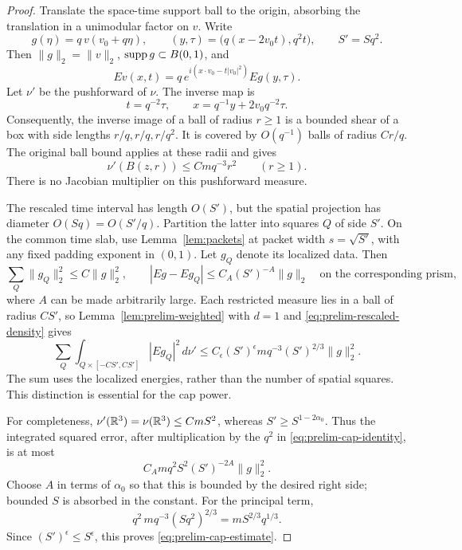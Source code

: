 \begin{proof}
Translate the space-time support ball to the origin, absorbing the
translation in a unimodular factor on $v$.  Write
\[
 g(\eta)=q\,v(v_0+q\eta),\qquad
 (y,\tau)=\bigl(q(x-2v_0t),q^2t\bigr),\qquad S'=Sq^2.
\]
Then $\|g\|_2=\|v\|_2$, $\operatorname{supp} g\subset B(0,1)$, and
\begin{equation}
 Ev(x,t)=q\,e^{i(x\cdot v_0-t|v_0|^2)}Eg(y,\tau).
 \label{eq:prelim-cap-identity}
\end{equation}
Let $\nu'$ be the pushforward of $\nu$.  The inverse map is
\[
 t=q^{-2}\tau,\qquad x=q^{-1}y+2v_0q^{-2}\tau.
\]
Consequently, the inverse image of a ball of radius $r\geq1$ is a bounded
shear of a box with side lengths $r/q,r/q,r/q^2$.  It is covered by
$O(q^{-1})$ balls of radius $Cr/q$.  The original ball bound applies at
these radii and gives
\begin{equation}
 \nu'(B(z,r))\leq Cm q^{-3}r^2\qquad(r\geq1).
 \label{eq:prelim-rescaled-density}
\end{equation}
There is no Jacobian multiplier on this pushforward measure.

The rescaled time interval has length $O(S')$, but the spatial projection
has diameter $O(Sq)=O(S'/q)$.  Partition the latter into squares $Q$ of
side $S'$.  On the common time slab, use Lemma~\ref{lem:packets} at packet
width $s=\sqrt{S'}$, with any fixed padding exponent in $(0,1)$.  Let
$g_Q$ denote its localized data.  Then
\[
 \sum_Q\|g_Q\|_2^2\leq C\|g\|_2^2,
 \qquad |Eg-Eg_Q|\leq C_A(S')^{-A}\|g\|_2
 \quad\text{on the corresponding prism},
\]
where $A$ can be made arbitrarily large.  Each restricted measure lies in a
ball of radius $CS'$, so Lemma~\ref{lem:prelim-weighted} with $d=1$ and
\eqref{eq:prelim-rescaled-density} gives
\[
 \sum_Q\int_{Q\times[-CS',CS']}|Eg_Q|^2\,d\nu'
 \leq C_\epsilon(S')^\epsilon m q^{-3}(S')^{2/3}\|g\|_2^2.
\]
The sum uses the localized energies, rather than the number of spatial
squares.  This distinction is essential for the cap power.

For completeness, $\nu'(\mathbb R^3)=\nu(\mathbb R^3)\leq CmS^2$, whereas
$S'\geq S^{1-2\alpha_0}$.  Thus the integrated squared error, after
multiplication by the $q^2$ in \eqref{eq:prelim-cap-identity}, is at most
\[
 C_A m q^2 S^2(S')^{-2A}\|g\|_2^2.
\]
Choose $A$ in terms of $\alpha_0$ so that this is bounded by the desired
right side; bounded $S$ is absorbed in the constant.  For the principal term,
\begin{equation}
 q^2\,m q^{-3}(Sq^2)^{2/3}
 =mS^{2/3}q^{1/3}.
 \label{eq:prelim-cap-power}
\end{equation}
Since $(S')^\epsilon\leq S^\epsilon$, this proves
\eqref{eq:prelim-cap-estimate}.


\end{proof}
